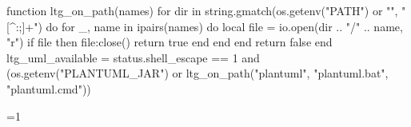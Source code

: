 \ifluatex
  \usepackage{luacode}
  \begin{luacode*}
    function ltg_on_path(names)
      for dir in string.gmatch(os.getenv("PATH") or "", "[^:;]+") do
        for _, name in ipairs(names) do
          local file = io.open(dir .. "/" .. name, "r")
          if file then
            file:close()
            return true
          end
        end
      end
      return false
    end
    ltg_uml_available = status.shell_escape == 1 and (os.getenv("PLANTUML_JAR") or ltg_on_path({"plantuml", "plantuml.bat", "plantuml.cmd"}))
  \end{luacode*}
  \ifnum{}=1
    \usepackage[output=latex]{plantuml}
  \fi
\fi
